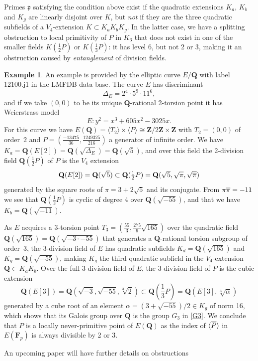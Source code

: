 \documentclass{amsart}
\theoremstyle{plain}
\theoremstyle{definition}
\newtheorem{example}[theorem]{Example}
\newcommand{\FF}{{\mathbf{F}}}
\newcommand{\Que}{{\mathbf{Q}}}
\newcommand{\Zee}{{\mathbf{Z}}}
\newcommand{\gothp}{{\mathfrak{p}}}
\newcommand{\iso}{\cong}
\newcommand{\mybar}[1]{
  \mathchoice
  {#1\llap{$\overline{\phantom{\displaystyle\rm#1}}$}}
  {#1\llap{$\overline{\phantom{\textstyle\rm#1}}$}}
  {#1\llap{$\overline{\phantom{\scriptstyle\rm#1}}$}}
  {#1\llap{$\overline{\phantom{\scriptscriptstyle\rm#1}}$}}
}
\renewcommand{\bar}{\mybar}
\begin{document}
Primes $\gothp$ satisfying the condition above exist if the quadratic extensions
$K_a$, $K_b$ and $K_g$ are linearly disjoint over $K$, but \emph{not} if they are the three
quadratic subfields of a $V_4$-extension $K\subset K_a K_b K_g$.
In the latter case, we have a splitting obstruction to local primitivity of $P$ in $K_6$ that does not 
exist in one of the smaller fields $K(\frac12 P)$ or $K(\frac13 P)$: it has level 6, but not 2 or 3,
making it an obstruction caused by \emph{entanglement} of division fields.
\begin{example}
An example is provided by the elliptic curve $E/\Que$ with label
12100.j1 in the LMFDB data base.
The curve $E$ has discriminant
$$\Delta_E=2^4\cdot5^9\cdot11^6,
$$
and if we take $(0,0)$ to be its unique $\Que$-rational 2-torsion point
it has Weierstrass model
$$
E: y^2=
x^3 + 605x^2 -3025x.$$
For this curve we have 
$E(\Que)=\langle T_2\rangle\times\langle P\rangle \iso \Zee/2\Zee\times \Zee$
with $T_2=(0,0)$ of order~$2$ and 
$P=(\frac{-13475}{36}, \frac{1249325}{216})$ 
a generator of infinite order.
We have $K_a=\Que(E[2])=\Que(\sqrt{\Delta_E})=\Que(\sqrt 5)$, and over this field
the 2-division field $\Que(\frac12P)$ of $P$ is the $V_4$ extension
$$\Que(E[2])=\Que(\sqrt{5})\subset\Que(\textstyle\frac12P)= 
\Que(\sqrt{5},\sqrt\pi, \sqrt{\bar\pi})
$$
generated by the square roots of $\pi=3+2\sqrt5$ and its conjugate.
From $\pi\bar\pi=-11$ we see that $\Que(\frac12P)$ is cyclic of degree 4 over $\Que(\sqrt{-55})$, and that
we have $K_b=\Que(\sqrt{-11})$.

As $E$ acquires a 3-torsion point $T_3=(\frac{55}{3}, \frac{275}{9}\sqrt{165})$ 
over the quadratic field $\Que(\sqrt{165})=\Que(\sqrt{-3\cdot-55})$ 
that generates a $\Que$-rational torsion subgroup of order~3,
the 3-division field of $E$ has quadratic subfields $K_d=\Que(\sqrt{165})$ and $K_g=\Que(\sqrt{-55})$, making
$K_g$ the third quadratic subfield in the $V_4$-extension $\Que\subset K_aK_b$.
Over the full 3-division field of $E$, the 3-division field of $P$ is the cubic extension
$$
\Que(E[3])=\Que(\sqrt{-3}, \sqrt{-55},\sqrt[3]{2})
\subset\Que(\textstyle\frac13P)=
\Que(E[3], \sqrt[3]{\alpha})
$$
generated by a cube root of an element $\alpha=(3+\sqrt{-55})/2\in K_g$ of norm 16, which shows that
its Galois group over $\Que$ is the group $G_3$ in \eqref{G3}.
We conclude that $P$ is a locally never-primitive point of $E(\Que)$ as the index of $\langle\bar P\rangle$
in $E(\FF_p)$ is always divisible by 2 or 3.
\end{example}
\noindent
An upcoming paper will have further details on obstructions 
\end{document}
